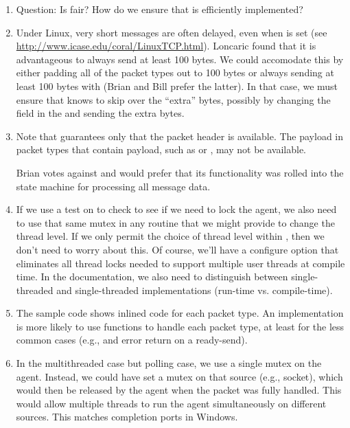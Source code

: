 \begin{enumerate}
\item Question: Is  fair?  How do we ensure that
   is efficiently implemented?

\item Under Linux, very short messages are often delayed, even when
   is set (see
  \url{http://www.icase.edu/coral/LinuxTCP.html}).  Loncaric found that it is 
  advantageous 
  to always send at least 100 bytes.  We could accomodate this by either
  padding all of the packet types out to 100 bytes or always sending at least
  100 bytes with  (Brian and Bill prefer the latter).  In
  that case, we must ensure that 
   knows to skip over the ``extra'' bytes, possibly
  by 
  changing the  field in the  and sending the extra
  bytes.  

\item Note that  guarantees only that the packet
  header is available.  The payload in packet types that contain payload, such
  as  or , may not be
  available.  

  Brian votes against  and would prefer that its
  functionality was rolled into the state machine for processing all message
  data.  

\item If we use a test on  to check to see if we
  need to lock the agent, we also need to use that same mutex in any routine
  that we might provide to change the thread level.  If we only permit the
  choice of thread level within , then we don't need
  to worry about this.  Of course, we'll have a configure option
   that eliminates all thread locks needed
  to support multiple user threads at compile time.  In the documentation, we
  also need to distinguish between single-threaded and single-threaded
  implementations (run-time vs. compile-time).

\item The sample code shows inlined code for each packet type.  An
  implementation is more likely to use functions to handle each packet type,
  at least for the less common cases (e.g.,  and
  error return on a ready-send).

\item In the multithreaded case but polling case, we use a single mutex on the
  agent.  Instead, we could have  set a mutex on that
  source (e.g., socket), which would then be released by the agent when the
  packet was fully handled.  This would allow multiple threads to run the
  agent simultaneously on different sources.  This matches completion ports in
  Windows.  
\end{enumerate}

